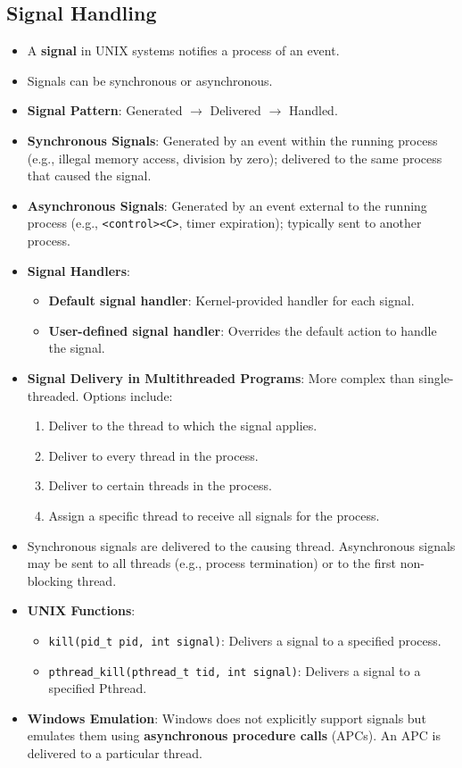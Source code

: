 \subsection{Signal Handling}
\begin{itemize}
    \item A \textbf{signal} in UNIX systems notifies a process of an event.
    \item Signals can be synchronous or asynchronous.
    \item \textbf{Signal Pattern}: Generated $\rightarrow$ Delivered $\rightarrow$ Handled.
    \item \textbf{Synchronous Signals}: Generated by an event within the running process (e.g., illegal memory access, division by zero); delivered to the same process that caused the signal.
    \item \textbf{Asynchronous Signals}: Generated by an event external to the running process (e.g., \texttt{<control><C>}, timer expiration); typically sent to another process.
    \item \textbf{Signal Handlers}:
        \begin{itemize}
            \item \textbf{Default signal handler}: Kernel-provided handler for each signal.
            \item \textbf{User-defined signal handler}: Overrides the default action to handle the signal.
        \end{itemize}
    \item \textbf{Signal Delivery in Multithreaded Programs}: More complex than single-threaded. Options include:
        \begin{enumerate}
            \item Deliver to the thread to which the signal applies.
            \item Deliver to every thread in the process.
            \item Deliver to certain threads in the process.
            \item Assign a specific thread to receive all signals for the process.
        \end{enumerate}
    \item Synchronous signals are delivered to the causing thread. Asynchronous signals may be sent to all threads (e.g., process termination) or to the first non-blocking thread.
    \item \textbf{UNIX Functions}:
        \begin{itemize}
            \item \texttt{kill(pid\_t pid, int signal)}: Delivers a signal to a specified process.
            \item \texttt{pthread\_kill(pthread\_t tid, int signal)}: Delivers a signal to a specified Pthread.
        \end{itemize}
    \item \textbf{Windows Emulation}: Windows does not explicitly support signals but emulates them using \textbf{asynchronous procedure calls} (APCs). An APC is delivered to a particular thread.
\end{itemize}

